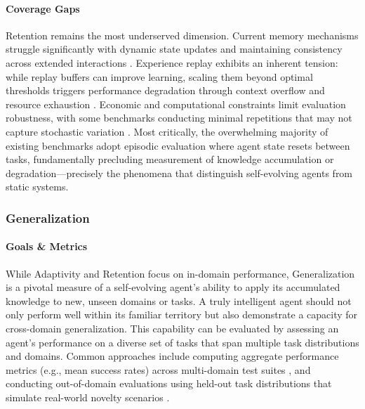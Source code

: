\documentclass[10pt]{article} %
\begin{document}
\paragraph{Coverage Gaps} Retention remains the most underserved dimension. Current memory mechanisms struggle significantly with dynamic state updates and maintaining consistency across extended interactions \citep{hu2025evaluating}. Experience replay exhibits an inherent tension: while replay buffers can improve learning, scaling them beyond optimal thresholds triggers performance degradation through context overflow and resource exhaustion \citep{zheng2025lifelongagentbench}. Economic and computational constraints limit evaluation robustness, with some benchmarks conducting minimal repetitions that may not capture stochastic variation \citep{castillo-bolado2024beyond}. Most critically, the overwhelming majority of existing benchmarks adopt episodic evaluation where agent state resets between tasks, fundamentally precluding measurement of knowledge accumulation or degradation—precisely the phenomena that distinguish self-evolving agents from static systems.

\subsubsection{Generalization}
\paragraph{Goals \& Metrics}
While Adaptivity and Retention focus on in-domain performance, Generalization is a pivotal measure of a self-evolving agent’s ability to apply its accumulated knowledge to new, unseen domains or tasks. A truly intelligent agent should not only perform well within its familiar territory but also demonstrate a capacity for cross-domain generalization. This capability can be evaluated by assessing an agent’s performance on a diverse set of tasks that span multiple task distributions and domains. Common approaches include computing aggregate performance metrics (e.g., mean success rates) across multi-domain test suites \citep{liu2023agentbench, sun2023adaplanner}, and conducting out-of-domain evaluations using held-out task distributions that simulate real-world novelty scenarios \citep{hu2024agentgen, peng2025dlpo}.
\end{document}
